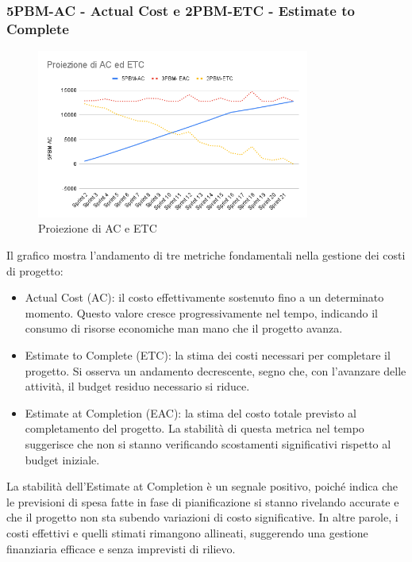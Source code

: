 \documentclass{article}
\begin{document}
        \subsubsection{5PBM-AC - Actual Cost e 2PBM-ETC - Estimate to Complete}
        \begin{figure}[H]
            \centering
            \includegraphics[width=0.8\textwidth]{../../../img/pdq_charts/chart2-proiezioneACETC.png}
            \caption{Proiezione di AC e ETC}
        \end{figure}
        Il grafico mostra l’andamento di tre metriche fondamentali nella gestione dei costi di progetto:
        \begin{itemize}
            \item Actual Cost (AC): il costo effettivamente sostenuto fino a un determinato momento. Questo valore cresce progressivamente nel tempo, indicando il consumo di risorse economiche man mano che il progetto avanza.  
            \item Estimate to Complete (ETC): la stima dei costi necessari per completare il progetto. Si osserva un andamento decrescente, segno che, con l’avanzare delle attività, il budget residuo necessario si riduce.  
            \item Estimate at Completion (EAC): la stima del costo totale previsto al completamento del progetto. La stabilità di questa metrica nel tempo suggerisce che non si stanno verificando scostamenti significativi rispetto al budget iniziale.  
        \end{itemize}
        La stabilità dell’Estimate at Completion è un segnale positivo, poiché indica che le previsioni di spesa fatte in fase di pianificazione si stanno rivelando accurate e che il progetto non sta subendo variazioni di costo significative. In altre parole, i costi effettivi e quelli stimati rimangono allineati, suggerendo una gestione finanziaria efficace e senza imprevisti di rilievo.
\end{document}
